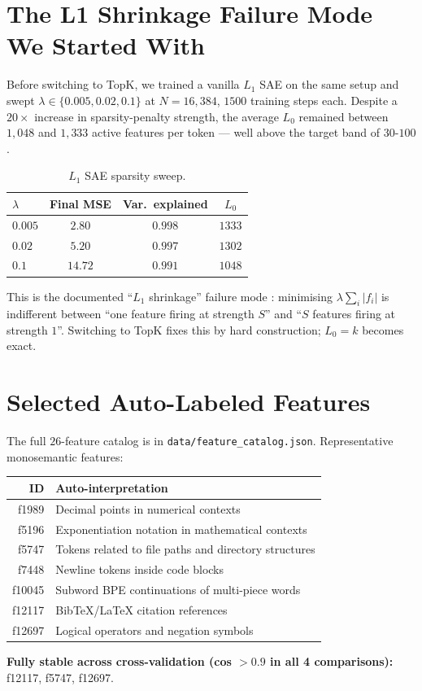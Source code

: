 \documentclass[11pt]{article}
\begin{document}
\appendix

\section{The L1 Shrinkage Failure Mode We Started With}
\label{app:l1-shrinkage}

Before switching to TopK, we trained a vanilla $L_1$ SAE on the same
setup and swept $\lambda \in \{0.005, 0.02, 0.1\}$ at $N = 16{,}384$,
$1500$ training steps each. Despite a $20\times$ increase in
sparsity-penalty strength, the average $L_0$ remained between $1{,}048$
and $1{,}333$ active features per token --- well above the target band
of $30$-$100$.

\begin{table}[h]
\centering
\caption{$L_1$ SAE sparsity sweep.}
\label{tab:l1-sweep}
\begin{tabular}{lccc}
\toprule
$\lambda$ & Final MSE & Var.\ explained & $L_0$ \\
\midrule
$0.005$ & $2.80$ & $0.998$ & $1333$ \\
$0.02$  & $5.20$ & $0.997$ & $1302$ \\
$0.1$   & $14.72$ & $0.991$ & $1048$ \\
\bottomrule
\end{tabular}
\end{table}

This is the documented ``$L_1$ shrinkage'' failure mode
\cite{rajamanoharan2024gated}: minimising $\lambda \sum_i |f_i|$ is
indifferent between ``one feature firing at strength $S$'' and ``$S$
features firing at strength $1$''. Switching to TopK fixes this by hard
construction; $L_0 = k$ becomes exact.

\section{Selected Auto-Labeled Features}
\label{app:features}

The full $26$-feature catalog is in
\texttt{data/feature\_catalog.json}. Representative monosemantic
features:

\begin{tabular}{rl}
\toprule
ID & Auto-interpretation \\
\midrule
f1989 & Decimal points in numerical contexts \\
f5196 & Exponentiation notation in mathematical contexts \\
f5747 & Tokens related to file paths and directory structures \\
f7448 & Newline tokens inside code blocks \\
f10045 & Subword BPE continuations of multi-piece words \\
f12117 & BibTeX/LaTeX citation references \\
f12697 & Logical operators and negation symbols \\
\bottomrule
\end{tabular}

\textbf{Fully stable across cross-validation (cos $> 0.9$ in all 4
comparisons):} f12117, f5747, f12697.
\end{document}
